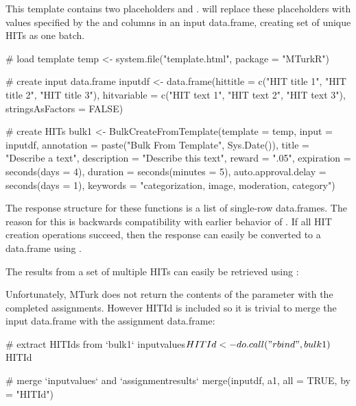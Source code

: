 \noindent This template contains two placeholders  and .  will replace these placeholders with values specified by the  and  columns in an input data.frame, creating set of unique HITs as one batch.

\begin{example}
# load template
temp <- system.file("template.html", package = "MTurkR")

# create input data.frame
inputdf <- data.frame(hittitle = c("HIT title 1", "HIT title 2", "HIT title 3"),
                      hitvariable = c("HIT text 1", "HIT text 2", "HIT text 3"), 
                      stringsAsFactors = FALSE)

# create HITs
bulk1 <- 
BulkCreateFromTemplate(template = temp,
                       input = inputdf,
                       annotation = paste("Bulk From Template", Sys.Date()),
                       title = "Describe a text",
                       description = "Describe this text",
                       reward = ".05",
                       expiration = seconds(days = 4),
                       duration = seconds(minutes = 5),
                       auto.approval.delay = seconds(days = 1),
                       keywords = "categorization, image, moderation, category")
\end{example}

\noindent The response structure for these functions is a list of single-row data.frames. The reason for this is backwards compatibility with earlier behavior of . If all HIT creation operations succeed, then the response can easily be converted to a data.frame using .

The results from a set of multiple HITs can easily be retrieved using :


\noindent Unfortunately, MTurk does not return the contents of the  parameter with the completed assignments. However HITId is included so it is trivial to merge the input data.frame with the assignment data.frame:

\begin{example}
# extract HITIds from `bulk1`
inputvalues$HITId <- do.call("rbind", bulk1)$HITId

# merge `inputvalues` and `assignmentresults`
merge(inputdf, a1, all = TRUE, by = "HITId")
\end{example}

